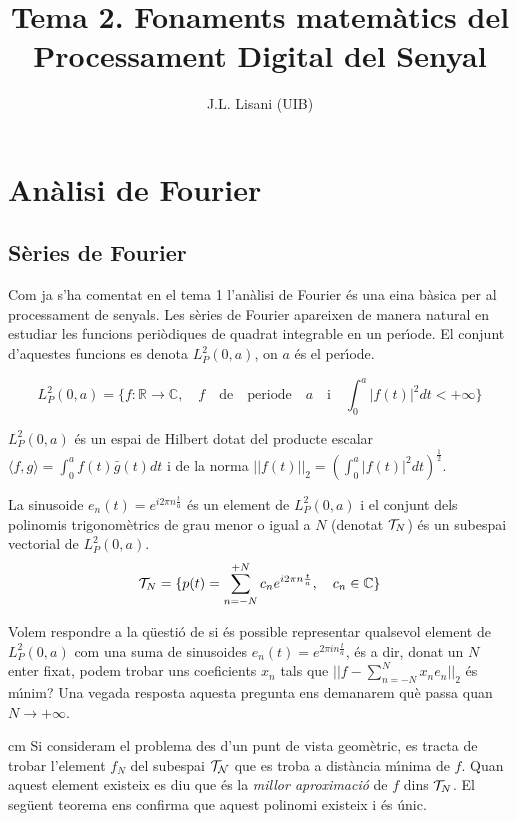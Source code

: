 \documentclass{article}
\title{Tema 2. Fonaments matem\`atics del Processament Digital del Senyal}
\author{{\small J.L. Lisani (UIB)}}
\date{}
\def\R{\mathbb R}
\def\C{\mathbb C}
\begin{document}
\maketitle

\tableofcontents

\section{An\`alisi de Fourier}
\subsection{S\`eries de Fourier}
Com ja s'ha comentat en el tema 1 l'an\`alisi de Fourier \'es una eina
b\`asica per al processament de senyals.
\newline
Les s\`eries de Fourier apareixen de manera natural en estudiar les funcions
peri\`odiques de quadrat integrable en un per\'\i ode. El conjunt d'aquestes 
funcions es denota $L^2_P(0, a)$, on $a$ \'es el per\'\i ode.

\[ L^2_P(0, a) = \{ f: \R \rightarrow \C, \quad f \quad \mathrm{de} 
\quad \mathrm{periode} \quad 
a \quad \mathrm{i} \quad \int_0^a |f(t)|^2 dt < + \infty \} \]

$L^2_P(0, a)$ \'es un espai de Hilbert 
dotat del producte escalar 
$ \langle f, g \rangle = \int_0^a f(t) \bar{g}(t) dt$
i de la norma $||f(t)||_2= (\int_0^a |f(t)|^2 dt)^\frac{1}{2} $.

La sinusoide $e_n(t)=e^{i 2 \pi n \frac{t}{a}}$ \'es un element de 
$L^2_P(0, a)$ i el conjunt dels polinomis trigonom\`etrics de grau
menor o igual a $N$ (denotat ${\cal T}_N$) \'es un subespai vectorial de 
$L^2_P(0, a)$.
\[
{\cal T}_N=\{ p(t)=\sum_{n=-N}^{+N} c_n e^{i 2 \pi n \frac{t}{a} }, 
\quad c_n \in \C \}
\]

Volem respondre a la q\"uesti\'o de si \'es possible representar qualsevol
element de $L^2_P(0, a)$ com una suma de sinusoides 
$e_n(t)=e^{2 \pi i n \frac{t}{a}}$,
\'es a dir, donat un $N$ enter fixat, podem trobar uns coeficients $x_n$
tals que $||f - \sum_{n=-N}^{N} x_n e_n ||_2$ \'es m\'\i nim?
Una vegada resposta aquesta pregunta ens demanarem qu\`e passa quan 
$N \rightarrow + \infty$.
 
 cm
Si consideram el problema des d'un punt de vista geom\`etric, es tracta de
trobar l'element $f_N$ del subespai $\cal{T}_N$ que es troba a dist\`ancia
m\'\i nima de $f$. Quan aquest element existeix es diu que \'es la {\it millor
aproximaci\'o} de $f$ dins ${\cal T}_N$.
El seg\"uent teorema ens confirma que aquest polinomi existeix i \'es \'unic.
\end{document}
